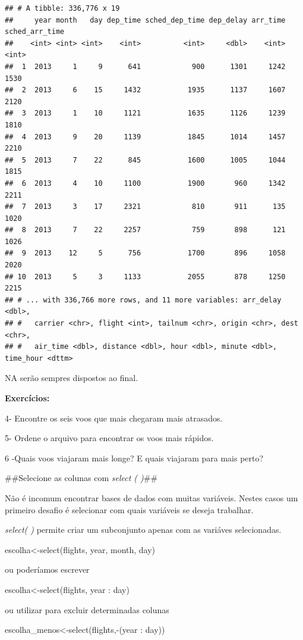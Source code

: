 \documentclass[
]{article}
\begin{document}
\begin{verbatim}
## # A tibble: 336,776 x 19
##     year month   day dep_time sched_dep_time dep_delay arr_time sched_arr_time
##    <int> <int> <int>    <int>          <int>     <dbl>    <int>          <int>
##  1  2013     1     9      641            900      1301     1242           1530
##  2  2013     6    15     1432           1935      1137     1607           2120
##  3  2013     1    10     1121           1635      1126     1239           1810
##  4  2013     9    20     1139           1845      1014     1457           2210
##  5  2013     7    22      845           1600      1005     1044           1815
##  6  2013     4    10     1100           1900       960     1342           2211
##  7  2013     3    17     2321            810       911      135           1020
##  8  2013     7    22     2257            759       898      121           1026
##  9  2013    12     5      756           1700       896     1058           2020
## 10  2013     5     3     1133           2055       878     1250           2215
## # ... with 336,766 more rows, and 11 more variables: arr_delay <dbl>,
## #   carrier <chr>, flight <int>, tailnum <chr>, origin <chr>, dest <chr>,
## #   air_time <dbl>, distance <dbl>, hour <dbl>, minute <dbl>, time_hour <dttm>
\end{verbatim}

NA serão sempres dispostos ao final.

\textbf{Exercícios:}

4- Encontre os seis voos que mais chegaram mais atrasados.

5- Ordene o arquivo para encontrar os voos mais rápidos.

6 -Quais voos viajaram mais longe? E quais viajaram para mais perto?

\#\#Selecione as colunas com \emph{select ( )}\#\#

Não é incomum encontrar bases de dados com muitas variáveis. Nestes
casos um primeiro desafio é selecionar com quais variáveis se deseja
trabalhar.

\emph{select( )} permite criar um subconjunto apenas com as variáves
selecionadas.

escolha\textless-select(flights, year, month, day)

ou poderíamos escrever

escolha\textless-select(flights, year : day)

ou utilizar para excluir determinadas colunas

escolha\_menos\textless-select(flights,-(year : day))
\end{document}
